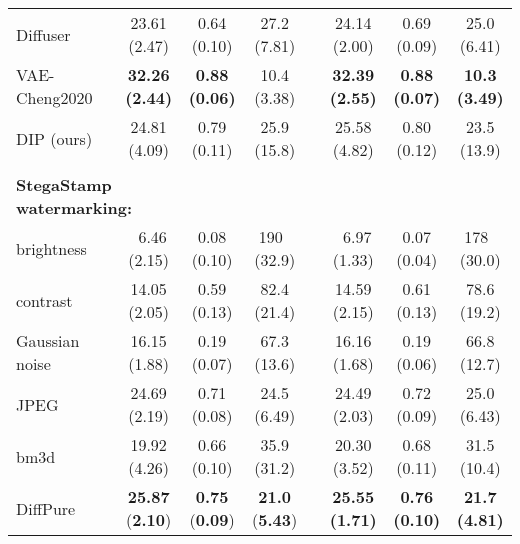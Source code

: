 \begin{table*}[!tb]
{\begin{tabular}{l c ccc c ccc}
\rowcolor{Gray}
\small{Diffuser} & & \small{23.61 \small{(2.47)}} & \small{0.64 \small{(0.10)}} & \small{27.2 \small{(7.81)}} & & \small{24.14 \small{(2.00)}} & \small{0.69 \small{(0.09)}} & \small{25.0 \small{(6.41)}}\\
\rowcolor{Gray}
\small{VAE-Cheng2020} & & \small{\textbf{32.26 \small{(2.44)}}} & \small{\textbf{0.88 \small{(0.06)}}} & \small{10.4 \small{(3.38)}} & & \small{\textbf{32.39 \small{(2.55)}}} & \small{\textbf{0.88 \small{(0.07)}}} & \small{\textbf{10.3 \small{(3.49)}}}\\
\hdashline
\rowcolor{Gray}
\small{DIP (ours)} & & \small{24.81 \small{(4.09)}} & \small{0.79 \small{(0.11)}} & \small{25.9 \small{(15.8)}} & & \small{25.58 \small{(4.82)}} & \small{0.80 \small{(0.12)}} & \small{23.5 \small{(13.9)}}\\
\toprule
\vspace{-0.9em}
\\
\multicolumn{3}{l}{\small{\textbf{StegaStamp watermarking: } }} & \multicolumn{6}{r}{}\\
\small{brightness} & & \small{~6.46 \small{(2.15)}} & \small{0.08 \small{(0.10)}} & \small{190~ \small{(32.9)}} & & \small{~6.97 \small{(1.33)}} & \small{0.07 \small{(0.04)}} & \small{178~ \small{(30.0)}}\\
\small{contrast} & & \small{14.05 \small{(2.05)}} & \small{0.59 \small{(0.13)}} & \small{82.4 \small{(21.4)}} & & \small{14.59 \small{(2.15)}} & \small{0.61 \small{(0.13)}} & \small{78.6 \small{(19.2)}}\\
\small{Gaussian noise} & & \small{16.15 \small{(1.88)}} & \small{0.19 \small{(0.07)}} & \small{67.3 \small{(13.6)}} & & \small{16.16 \small{(1.68)}} & \small{0.19 \small{(0.06)}} & \small{66.8 \small{(12.7)}}\\
\small{JPEG} & & \small{24.69 \small{(2.19)}} & \small{0.71 \small{(0.08)}} & \small{24.5 \small{(6.49)}} & & \small{24.49 \small{(2.03)}} & \small{0.72 \small{(0.09)}} & \small{25.0 \small{(6.43)}}\\
\rowcolor{Gray}
\small{bm3d}  & & \small{19.92 \small{(4.26)}} & \small{0.66 \small{(0.10)}} & \small{35.9 \small{(31.2)}} & & \small{20.30 \small{(3.52)}} & \small{0.68 \small{(0.11)}} & \small{31.5 \small{(10.4)}}\\
\rowcolor{Gray}
\small{DiffPure} & & \small{\textbf{25.87} \small{(\textbf{2.10})}} & \small{\textbf{0.75} \small{(\textbf{0.09})}} & \small{\textbf{21.0} \small{(\textbf{5.43})}} & & \small{\textbf{25.55 \small{(1.71)}}} & \small{\textbf{0.76 \small{(0.10)}}} & \small{\textbf{21.7 \small{(4.81)}}}\\

\end{tabular}}
\end{table*}
